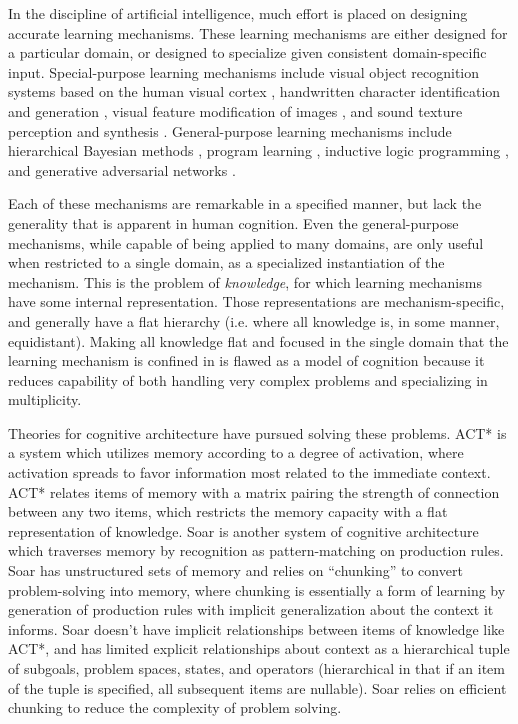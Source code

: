 \documentclass[11pt,letterpaper]{article}
\begin{document}
In the discipline of artificial intelligence, much effort is placed on
designing accurate learning mechanisms. These learning mechanisms are
either designed for a particular domain, or designed to specialize
given consistent domain-specific input. Special-purpose learning mechanisms
include visual object recognition systems based on the human visual cortex
\cite{serre07}, handwritten character identification and generation
\cite{lake15}, visual feature modification of images \cite{kulkarni15}, and
sound texture perception and synthesis \cite{mcdermott11}. General-purpose
learning mechanisms include hierarchical Bayesian methods
\cite{tenenbaum01}, program learning \cite{liang10}\cite{dechter13},
inductive logic programming \cite{lavrac94}\cite{muggleton15}, and
generative adversarial networks \cite{goodfellow14}.

Each of these mechanisms are remarkable in a specified manner, but lack the
generality that is apparent in human cognition. Even the general-purpose
mechanisms, while capable of being applied to many domains, are only useful
when restricted to a single domain, as a specialized instantiation of the
mechanism. This is the problem of \emph{knowledge}, for which learning
mechanisms have some internal representation. Those representations are
mechanism-specific, and generally have a flat hierarchy (i.e. where all
knowledge is, in some manner, equidistant). Making all knowledge flat and
focused in the single domain that the learning mechanism is confined in is
flawed as a model of cognition because it reduces capability of both
handling very complex problems and specializing in multiplicity.

Theories for cognitive architecture have pursued solving these problems.
ACT* \cite{anderson83} is a system which utilizes memory according to a
degree of activation, where activation spreads to favor information most
related to the immediate context. ACT* relates items of memory with a matrix
pairing the strength of connection between any two items, which restricts
the memory capacity with a flat representation of knowledge. Soar
\cite{newell94} is another system of cognitive architecture which traverses
memory by recognition as pattern-matching on production rules. Soar has
unstructured sets of memory and relies on ``chunking'' to convert
problem-solving into memory, where chunking is essentially a form of
learning by generation of production rules with implicit generalization
about the context it informs. Soar doesn't have implicit relationships
between items of knowledge like ACT*, and has limited explicit relationships
about context as a hierarchical tuple of subgoals, problem spaces, states,
and operators (hierarchical in that if an item of the tuple is specified,
all subsequent items are nullable). Soar relies on efficient chunking to
reduce the complexity of problem solving.
\end{document}
